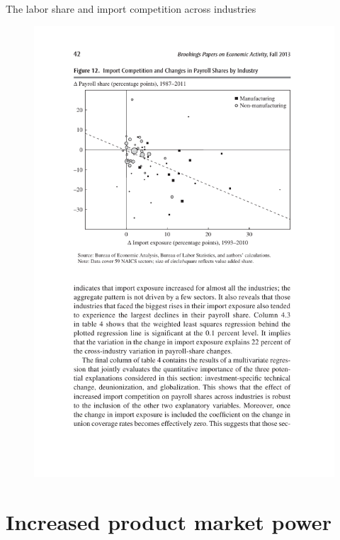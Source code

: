\documentclass[notes=show]{beamer}
\begin{document}
\begin{frame}{The labor share and import competition across industries}
\begin{figure}[p!]
 \includegraphics[width=.8\textwidth]{figure-EHS-12.pdf} 
\end{figure}
\end{frame}

\section{Increased product market power}
\end{document}
